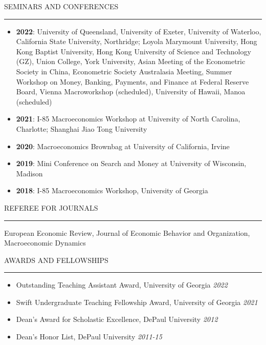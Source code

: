 \documentclass{resume} %
\renewenvironment{rSection}[1]{
\sectionskip
\textcolor{lmublue}{\MakeUppercase{#1}}
\sectionlineskip
\hrule
\begin{list}{}{
\setlength{\leftmargin}{1.5em}
}
\item[]
}{
\end{list}
}
\begin{document}
\begin{rSection}{SEMINARS AND CONFERENCES }
\begin{itemize}
\item[] \textbf{2022}: University of Queensland, University of Exeter, University of Waterloo, California State University, Northridge; Loyola Marymount University, Hong Kong Baptist University, Hong Kong University of Science and Technology (GZ), Union College, York University, Asian Meeting of the Econometric Society in China, Econometric Society Australasia Meeting, Summer Workshop on Money, Banking, Payments, and Finance at Federal Reserve Board, Vienna Macroworkshop (scheduled), University of Hawaii, Manoa (scheduled)
\item[] \textbf{2021}: I-85 Macroeconomics Workshop at University of North Carolina, Charlotte; Shanghai Jiao Tong University   
\item[] \textbf{2020}: Macroeconomics Brownbag at University of California, Irvine    
\item[] \textbf{2019}: Mini Conference on Search and Money at University of Wisconsin, Madison   
\item[] \textbf{2018}: I-85 Macroeconomics Workshop, University of Georgia  
\end{itemize}
\end{rSection}

			
\begin{rSection}{REFEREE FOR JOURNALS}  
European Economic Review, Journal of Economic Behavior and Organization, Macroeconomic Dynamics 
\end{rSection}

\begin{rSection}{AWARDS AND FELLOWSHIPS}  
\begin{itemize}
\item[] Outstanding Teaching Assistant Award, University of Georgia  \hfill {\em 2022} 
\item[] Swift Undergraduate Teaching Fellowship Award, University of Georgia \hfill {\em 2021}
\item[] Dean's Award for Scholastic Excellence, DePaul University  \hfill {\em 2012 } 
\item[]Dean’s Honor List, DePaul University \hfill {\em 2011-15}
\end{itemize}
\end{rSection}
\end{document}
